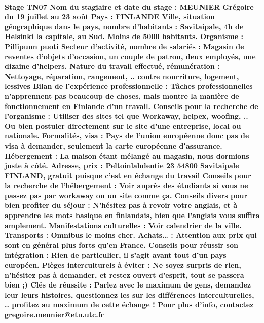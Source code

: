 \documentclass[a4paper,12pt]{report} %
\begin{document}
\paragraph{Stage TN07 \newline
Nom du stagiaire et date du stage : MEUNIER Grégoire du 19 juillet au 23 août\newline
Pays : FINLANDE\newline
Ville, situation géographique dans le pays, nombre d’habitants : Savitaipale, 4h de Helsinki la capitale, au Sud. Moins de 5000 habitants. \newline
Organisme : Pillipuun puoti\newline
Secteur d’activité, nombre de salariés : Magasin de reventes d'objets d'occasion, un couple de patron, deux employés, une dizaine d'helpers.\newline
Nature du travail effectué, rémunération : Nettoyage, réparation, rangement, .. contre nourriture, logement, lessives\newline
Bilan de l’expérience professionnelle : Tâches professionnelles n'apprennent pas beaucoup de choses, mais montre la manière de fonctionnement en Finlande d'un travail.\newline
Conseils pour la recherche de l’organisme : Utiliser des sites tel que Workaway, helpex, woofing, .. Ou bien postuler directement sur le site d'une entreprise, local ou nationale.\newline
Formalités, visa : Pays de l'union européenne donc pas de visa à demander, seulement la carte européenne d'assurance.\newline
Hébergement : La maison étant mélangé au magasin, nous dormions juste à côté.\newline
Adresse, prix : Peltoinlahdentie 23  54800 Savitaipale FINLAND, gratuit puisque c'est en échange du travail\newline
Conseils pour la recherche de l’hébergement : Voir auprès des étudiants si vous ne passez pas par workaway ou un site comme ça.\newline
Conseils divers pour bien profiter du séjour : N'hésitez pas à revoir votre anglais, et à apprendre les mots basique en finlandais, bien que l'anglais vous suffira amplement.\newline
Manifestations culturelles : Voir calendrier de la ville.\newline
Transports : Omnibus le moins cher.\newline
Achats… : Attention aux prix qui sont en général plus forts qu'en France.\newline
Conseils pour réussir son intégration : Rien de particulier, il s'agit avant tout d'un pays européen.\newline
Pièges interculturels à éviter : Ne soyez surpris de rien, n'hésitez pas à demander, et restez ouvert d'esprit, tout se passera bien ;)\newline
Clés de réussite : Parlez avec le maximum de gens, demandez leur leurs histoires, questionnez les sur les différences interculturelles, .. profitez au maximum de cette échange !\newline
Pour plus d’info, contactez gregoire.meunier@etu.utc.fr\newline}
\end{document}
